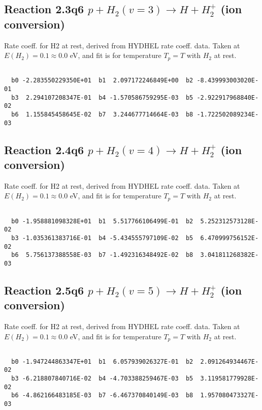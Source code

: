 \newpage
\subsection{
Reaction 2.3q6
$ p + H_2(v=3) \rightarrow H + H_2^+$ (ion conversion)
}
Rate coeff. for H2 at rest, derived from HYDHEL rate coeff. data.
Taken at $E(H_2) = 0.1 \approx 0.0$ eV,  and fit is for temperature $T_p=T$ with $H_2$ at rest.

\begin{small}\begin{verbatim}

  b0 -2.283550229350E+01  b1  2.097172246849E+00  b2 -8.439993003020E-01
  b3  2.294107208347E-01  b4 -1.570586759295E-03  b5 -2.922917968840E-02
  b6  1.155845458645E-02  b7  3.244677714664E-03  b8 -1.722502089234E-03

\end{verbatim}\end{small}

\newpage
\subsection{
Reaction 2.4q6
$ p + H_2(v=4) \rightarrow H + H_2^+$ (ion conversion)
}
Rate coeff. for H2 at rest, derived from HYDHEL rate coeff. data.
Taken at $E(H_2) = 0.1 \approx 0.0$ eV,  and fit is for temperature $T_p=T$ with $H_2$ at rest.

\begin{small}\begin{verbatim}

  b0 -1.958881098328E+01  b1  5.517766106499E-01  b2  5.252312573128E-02
  b3 -1.035361383716E-01  b4 -5.434555797109E-02  b5  6.470999756152E-02
  b6  5.756137388558E-03  b7 -1.492316348492E-02  b8  3.041811268382E-03

\end{verbatim}\end{small}

\newpage
\subsection{
Reaction 2.5q6
$ p + H_2(v=5) \rightarrow H + H_2^+$ (ion conversion)
}
Rate coeff. for H2 at rest, derived from HYDHEL rate coeff. data.
Taken at $E(H_2) = 0.1 \approx 0.0$ eV,  and fit is for temperature $T_p=T$ with $H_2$ at rest.

\begin{small}\begin{verbatim}

  b0 -1.947244863347E+01  b1  6.057939026327E-01  b2  2.091264934467E-02
  b3 -6.218807840716E-02  b4 -4.703388259467E-03  b5  3.119581779928E-02
  b6 -4.862166483185E-03  b7 -6.467370840149E-03  b8  1.957080473327E-03

\end{verbatim}\end{small}

